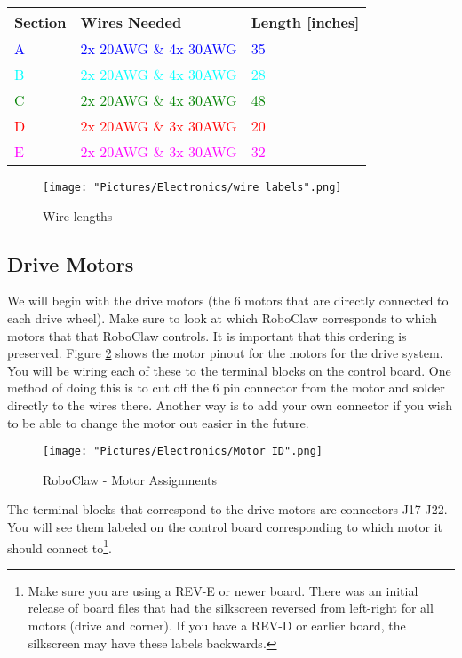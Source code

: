 \documentclass{article}
\begin{document}
\begin{tabular}[3] {| p{2cm} | p{7cm} | p{4cm} |}
	\hline
	\textbf{Section} & \textbf{Wires Needed} & \textbf{Length [inches]}  \\ \hline
	\textcolor{blue}{A} & \textcolor{blue}{2x 20AWG \& 4x 30AWG} & \textcolor{blue}{35} \\ \hline
	\textcolor{cyan}{B} & \textcolor{cyan}{2x 20AWG \& 4x 30AWG} & \textcolor{cyan}{28} \\ \hline
	\textcolor{green}{C} & \textcolor{green}{2x 20AWG \& 4x 30AWG} & \textcolor{green}{48} \\ \hline
	\textcolor{red}{D} & \textcolor{red}{2x 20AWG \& 3x 30AWG} & \textcolor{red}{20} \\ \hline
	\textcolor{magenta}{E} & \textcolor{magenta}{2x 20AWG \& 3x 30AWG} & \textcolor{magenta}{32} \\ \hline
\end{tabular}

\begin{figure}[H]
 	\centering
	\texttt{[image: "Pictures/Electronics/wire labels".png]}
 	\caption{Wire lengths}
	\label{wire lengths}
\end{figure}

\subsection{Drive Motors}
We will begin with the drive motors (the 6 motors that are directly connected to each drive wheel). Make sure to look at which RoboClaw corresponds to which motors that that RoboClaw controls. It is important that this ordering is preserved. Figure \ref{motorID} shows the motor pinout for the motors for the drive system. You will be wiring each of these to the terminal blocks on the control board. One method of doing this is to cut off the 6 pin connector from the motor and solder directly to the wires there. Another way is to add your own connector if you wish to be able to change the motor out easier in the future.

\begin{figure}[H]
 	\centering
	\texttt{[image: "Pictures/Electronics/Motor ID".png]}
 	\caption{RoboClaw - Motor Assignments}
	\label{motorID}
\end{figure}

The terminal blocks that correspond to the drive motors are connectors J17-J22. You will see them labeled on the control board corresponding to which motor it should connect to\footnote{Make sure you are using a REV-E or newer board.  There was an initial release of board files that had the silkscreen reversed from left-right for all motors (drive and corner). If you have a REV-D or earlier board, the silkscreen may have these labels backwards.}.
\end{document}
